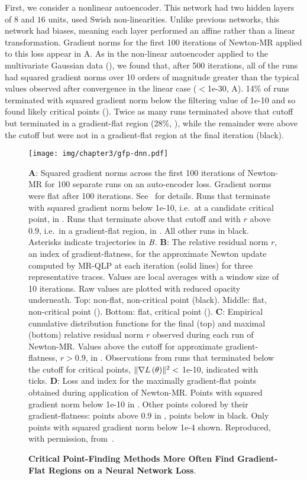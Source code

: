 \documentclass[../../thesis.tex]{subfiles}
\begin{document}
First, we consider a nonlinear autoencoder.
This network had two hidden layers of $8$ and $16$ units,
used Swish non-linearities.
Unlike previous networks, this network had biases,
meaning each layer performed an affine rather than a linear transformation.
Gradient norms for the first 100 iterations of Newton-MR
applied to this loss
appear in A.
As in the non-linear autoencoder applied to the multivariate Gaussian data
(),
we found that, after 500 iterations,
all of the runs had squared gradient norms
over 10 orders of magnitude greater than the typical
values observed after convergence in the linear case
($<$1e-30, A).
14\% of runs terminated with squared gradient norm
below the filtering value of 1e-10
and so found likely critical points
(\successcolor{}).
Twice as many runs terminated above that cutoff
but terminated in a gradient-flat region
(28\%, \failcolor{}),
while the remainder were above
the cutoff but were not in a gradient-flat region
at the final iteration
(black).

\begin{figure}[htpb]
	\begin{center}
	    \texttt{[image: img/chapter3/gfp-dnn.pdf]}
	\end{center}
	\caption{\textbf{Critical Point-Finding Methods
	More Often Find Gradient-Flat Regions
	on a Neural Network Loss}.}{%
	\textbf{A}:
	Squared gradient norms across the first 100 iterations of Newton-MR
	for 100 separate runs on an auto-encoder loss.
	Gradient norms were flat after 100 iterations.
	See~ for details.
	Runs that terminate with squared gradient norm below 1e-10,
	i.e.~at a candidate critical point, in \successcolor{}.
	Runs that terminate above that cutoff and with $r$ above $0.9$,
	i.e.~in a gradient-flat region, in \failcolor{}.
	All other runs in black.
	Asterisks indicate trajectories in $\emph{B}$.
	\textbf{B}:
	The relative residual norm $r$,
	an index of gradient-flatness,
	for the approximate Newton update
	computed by MR-QLP at each iteration
	(solid lines)
	for three representative traces.
	Values are local averages with a window size of 10 iterations.
	Raw values are plotted with reduced opacity underneath.
	Top: non-flat, non-critical point (black).
	Middle: flat, non-critical point (\failcolor{}).
	Bottom: flat, critical point (\successcolor{}).
	\textbf{C}:
	Empirical cumulative distribution functions for
	the final (top) and maximal (bottom) relative residual norm $r$ observed
	during each run of Newton-MR\@.
	Values above the cutoff for approximate gradient-flatness, $r>0.9$,
	in \failcolor{}.
	Observations from runs that terminated below the cutoff for critical points,
	$\lVert\nabla L\left(\theta\right)\rVert^2 <$ 1e-10,
	indicated with \successcolor{} ticks.
	\textbf{D}:
	Loss and index for the maximally gradient-flat points
	obtained during application of Newton-MR\@.
	Points with squared gradient norm below 1e-10 in \successcolor{}.
	Other points colored by their gradient-flatness:
	points above $0.9$ in \failcolor{}, points below in black.
	Only points with squared gradient norm below 1e-4 shown.
	Reproduced, with permission,
	from~\cite{frye2020}.%
	}
\end{figure}
\end{document}
